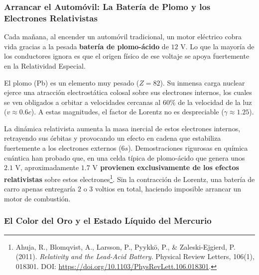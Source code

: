 \documentclass[11pt,a4paper]{book}
\begin{document}
\subsubsection{Arrancar el Automóvil: La Batería de Plomo y los Electrones Relativistas}

Cada mañana, al encender un automóvil tradicional, un motor eléctrico cobra vida gracias a la pesada \textbf{batería de plomo-ácido} de $12 \text{ V}$. Lo que la mayoría de los conductores ignora es que el origen físico de ese voltaje se apoya fuertemente en la Relatividad Especial.

El plomo (Pb) es un elemento muy pesado ($Z = 82$). Su inmensa carga nuclear ejerce una atracción electrostática colosal sobre sus electrones internos, los cuales se ven obligados a orbitar a velocidades cercanas al $60\%$ de la velocidad de la luz ($v \approx 0.6c$). A estas magnitudes, el factor de Lorentz no es despreciable ($\gamma \approx 1.25$). 

La dinámica relativista aumenta la masa inercial de estos electrones internos, retrayendo sus órbitas y provocando un efecto en cadena que estabiliza fuertemente a los electrones externos ($6s$). Demostraciones rigurosas en química cuántica han probado que, en una celda típica de plomo-ácido que genera unos $2.1 \text{ V}$, aproximadamente \textbf{$1.7 \text{ V}$ provienen exclusivamente de los efectos relativistas} sobre estos electrones\footnote{Ahuja, R., Blomqvist, A., Larsson, P., Pyykkö, P., \& Zaleski-Ejgierd, P. (2011). \textit{Relativity and the Lead-Acid Battery}. Physical Review Letters, 106(1), 018301. DOI: \url{https://doi.org/10.1103/PhysRevLett.106.018301}.}. Sin la contracción de Lorentz, una batería de carro apenas entregaría $2$ o $3$ voltios en total, haciendo imposible arrancar un motor de combustión.

\subsubsection{El Color del Oro y el Estado Líquido del Mercurio}
\end{document}
